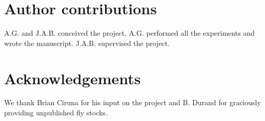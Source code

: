 \documentclass[12pt, twoside, letterpaper]{article}
\begin{document}
\section{Author contributions}
A.G. and J.A.B. conceived the project.
A.G. performed all the experiments and wrote the manuscript.
J.A.B. supervised the project.


\section{Acknowledgements}
We thank Brian Ciruna for his input on the project
and B. Durand for graciously providing unpublished fly stocks.


\end{document}
